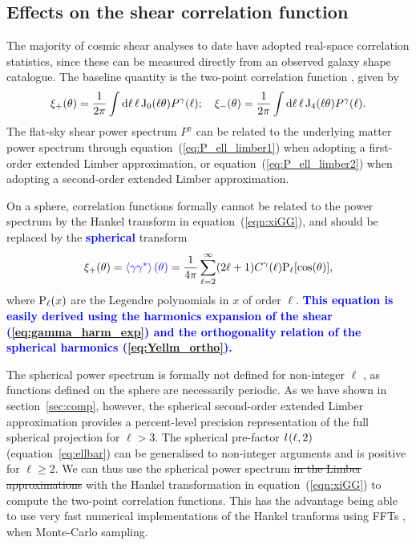 \documentclass[fleqn,usenatbib]{mnras} %
\newcommand{\ellbar}{\hbox{\it \l}\,}
\newcommand{\mk}[1]{{\bf\textcolor{blue}{#1}}}
\begin{document}
\subsection{Effects on the shear correlation function}
\label{sec:comp_xi}

The majority of cosmic shear analyses to date have adopted real-space
correlation statistics, since these can be measured directly from an observed
galaxy shape catalogue. The baseline quantity is the two-point correlation
function \citep{1991ApJ...370....1M, 1992ApJ...388..272K, BS01}, given by
%
\begin{align}
  \xi_+(\theta) 
  = \frac 1 {2\pi} \int {\rm d} \ell \, \ell \, {\rm J}_0(\ell
   \theta)
  P^\gamma(\ell);
  \quad
   \xi_-(\theta)
  = \frac 1 {2\pi} \int
   {\rm d} \ell \, \ell \, {\rm J}_4(\ell \theta)
  P^\gamma(\ell).
   \label{eqn:xiGG}
\end{align}
%
The flat-sky shear power spectrum $P^\gamma$ can be related to the underlying
matter power spectrum through equation~(\ref{eq:P_ell_limber1}) when adopting a
first-order extended Limber approximation, or equation~(\ref{eq:P_ell_limber2})
when adopting a second-order extended Limber approximation.

On a sphere, correlation functions formally cannot be related to the power
spectrum by the Hankel transform in equation~(\ref{eqn:xiGG}), and should
be replaced by the \mk{spherical} transform \citep{1973ApJ...185..413P}
%
\begin{equation}
 \xi_+(\theta) = \mk{\left\langle \gamma \gamma^\ast \right\rangle(\theta)}
  =  \frac 1{4\pi} \sum\limits_{\ell=2}^\infty (2 \ell + 1) C^\gamma(\ell) {\rm P}_\ell[\cos(\theta)],
  \label{eq:xi_Legendre}
\end{equation}
%
where ${\rm P}_\ell(x)$ are the Legendre polynomials in $x$ of order $\ell$. \mk{This equation is easily derived
using the harmonics expansion of the shear (\ref{eq:gamma_harm_exp}) and the orthogonality relation of
the spherical harmonics (\ref{eq:Yellm_ortho}).}

The spherical power spectrum is formally not defined for non-integer $\ell$
\citep[see][for alternative spherical-sky formulae for the two-point
correlation function]{2005PhRvD..72b3516C}, as functions defined on the
sphere are necessarily periodic.
As we have shown in section~\ref{sec:comp}, however, the spherical second-order
extended Limber approximation provides a percent-level precision representation
of the full spherical projection for $\ell > 3$.
The spherical pre-factor $\ellbar(\ell, 2)$ (equation~\ref{eq:ellbar}) can be
generalised to non-integer arguments and is positive for $\ell \ge 2$. We can
thus use the spherical power spectrum \sout{in the Limber approximations} with
the Hankel transformation in equation~(\ref{eqn:xiGG}) to compute the two-point correlation
functions. This has the advantage being able to use very fast numerical implementations of
the Hankel tranforms using FFTs \citep{fftlog}, when Monte-Carlo sampling.
\end{document}
